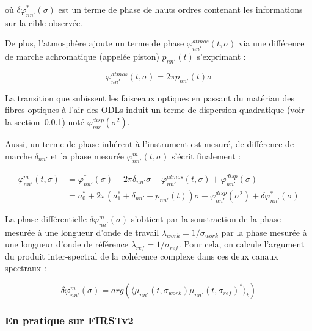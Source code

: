 \noindent où $\delta\varphi^{*}_{nn'}(\sigma)$ est un terme de phase de hauts ordres contenant les informations sur la cible observée.

De plus, l'atmosphère ajoute un terme de phase $\varphi^{atmos}_{nn'}(t, \sigma)$ via une différence de marche achromatique (appelée piston) $p_{nn'}(t)$ s'exprimant :

\begin{equation}
    \varphi^{atmos}_{nn'}(t, \sigma) = 2\pi p_{nn'}(t) \sigma
\end{equation}

La transition que subissent les faisceaux optiques en passant du matériau des fibres optiques à l'air des \ac{ODL}s induit un terme de dispersion quadratique (voir la section~\ref{sec:PhaseDiffFIRSTv2}) noté $\varphi^{disp}_{nn'}(\sigma^2)$. 

Aussi, un terme de phase inhérent à l'instrument est mesuré, de différence de marche $\delta_{nn'}$ et la phase mesurée $\varphi^{m}_{nn'}(t, \sigma)$ s'écrit finalement :

\begin{align}
    \varphi^{m}_{nn'}(t, \sigma) &= \varphi^{*}_{nn'}(\sigma) + 2\pi\delta_{nn'}\sigma + \varphi^{atmos}_{nn'}(t, \sigma) + \varphi^{disp}_{nn'}(\sigma)\\
    &= a^{*}_0 + 2\pi(a^{*}_1 + \delta_{nn'} + p_{nn'}(t)) \sigma + \varphi^{disp}_{nn'}(\sigma^2) + \delta\varphi^{*}_{nn'}(\sigma)\label{eq:phasefit}
\end{align}

La phase différentielle $\delta\varphi^{m}_{nn'}(\sigma)$ s'obtient par la soustraction de la phase mesurée à une longueur d'onde de travail $\lambda_{work} = 1 / \sigma_{work}$ par la phase mesurée à une longueur d'onde de référence $\lambda_{ref} = 1 / \sigma_{ref}$. Pour cela, on calcule l'argument du produit inter-spectral de la cohérence complexe dans ces deux canaux spectraux :

\begin{equation}
	\delta\varphi^{m}_{nn'}(\sigma) = arg \left ( \langle \mu_{nn'}(t, \sigma_{work}) \mu_{nn'}(t, \sigma_{ref})^* \rangle_t \right )
\end{equation}


\subsubsection{En pratique sur FIRSTv2}
\label{sec:PhaseDiffFIRSTv2}

